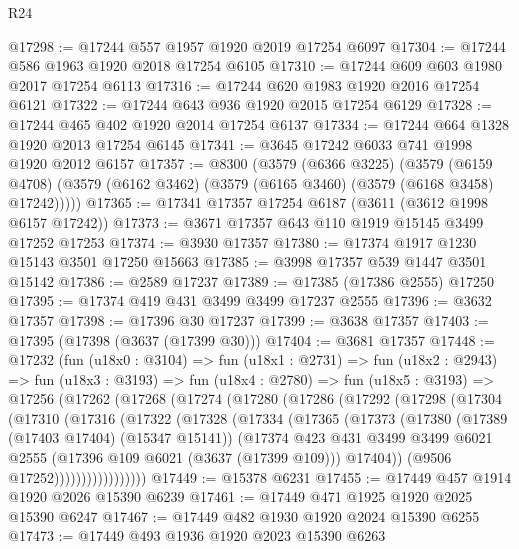 \begin{lexlean}{R24}
\begin{coremodule}
@17298 := @17244 @557 @1957 @1920 @2019 @17254 @6097
@17304 := @17244 @586 @1963 @1920 @2018 @17254 @6105
@17310 := @17244 @609 @603 @1980 @2017 @17254 @6113
@17316 := @17244 @620 @1983 @1920 @2016 @17254 @6121
@17322 := @17244 @643 @936 @1920 @2015 @17254 @6129
@17328 := @17244 @465 @402 @1920 @2014 @17254 @6137
@17334 := @17244 @664 @1328 @1920 @2013 @17254 @6145
@17341 := @3645 @17242 @6033 @741 @1998 @1920 @2012 @6157
@17357 := @8300
    (@3579
      (@6366 @3225)
      (@3579
        (@6159 @4708)
        (@3579 (@6162 @3462) (@3579 (@6165 @3460) (@3579 (@6168 @3458) @17242)))))
@17365 := @17341 @17357 @17254 @6187 (@3611 (@3612 @1998 @6157 @17242))
@17373 := @3671 @17357 @643 @110 @1919 @15145 @3499 @17252 @17253
@17374 := @3930 @17357
@17380 := @17374 @1917 @1230 @15143 @3501 @17250 @15663
@17385 := @3998 @17357 @539 @1447 @3501 @15142
@17386 := @2589 @17237
@17389 := @17385 (@17386 @2555) @17250
@17395 := @17374 @419 @431 @3499 @3499 @17237 @2555
@17396 := @3632 @17357
@17398 := @17396 @30 @17237
@17399 := @3638 @17357
@17403 := @17395 (@17398 (@3637 (@17399 @30)))
@17404 := @3681 @17357
@17448 := @17232
    (fun (u18x0 : @3104) =>
    fun (u18x1 : @2731) =>
    fun (u18x2 : @2943) =>
    fun (u18x3 : @3193) =>
    fun (u18x4 : @2780) =>
    fun (u18x5 : @3193) =>
    @17256
      (@17262
        (@17268
          (@17274
            (@17280
              (@17286
                (@17292
                  (@17298
                    (@17304
                      (@17310
                        (@17316
                          (@17322
                            (@17328
                              (@17334
                                (@17365
                                  (@17373
                                    (@17380
                                      (@17389 (@17403 @17404) (@15347 @15141))
                                      (@17374
                                        @423
                                        @431
                                        @3499
                                        @3499
                                        @6021
                                        @2555
                                        (@17396 @109 @6021 (@3637 (@17399 @109)))
                                        @17404))
                                    (@9506 @17252)))))))))))))))))
@17449 := @15378 @6231
@17455 := @17449 @457 @1914 @1920 @2026 @15390 @6239
@17461 := @17449 @471 @1925 @1920 @2025 @15390 @6247
@17467 := @17449 @482 @1930 @1920 @2024 @15390 @6255
@17473 := @17449 @493 @1936 @1920 @2023 @15390 @6263

\end{coremodule}
\end{lexlean}
